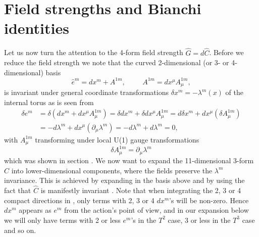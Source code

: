 \section{Field strengths and  Bianchi identities}
Let us now turn the attention to the 4-form field strength $\hat{G}=d\hat{C}$. Before we reduce the field strength 
we note that the curved 2-dimensional (or 3- or 4-dimensional) basis
\begin{equation}
\hat{e}^m = dx^m + A^{1m}, \hspace{1cm} A^{1m}=dx^{\mu}A_{\mu}^{1m},
\end{equation}
is invariant under general coordinate transformations $\delta x^m = -\lambda^m(x)$ of the internal torus as is seen from
\begin{align}
\delta e^m &= \delta(dx^m + dx^{\mu}A_{\mu}^{1m}) = \delta dx^m + \delta dx^{\mu}A_{\mu}^{1m} = d\delta x^m + dx^{\mu}(\delta A_{\mu}^{1m}) \nonumber \\
&= -d\lambda^m + dx^{\mu}({\partial}_{\mu}\lambda^m)=-d\lambda^m + d\lambda^m =0,
\end{align}
with $A_{\mu}^{1m}$ transforming under local U(1) gauge transformations
\begin{equation}
\delta A_{\mu}^{1m} = {\partial}_{\mu}\lambda^m
\end{equation}
which was shown in section .
We now want to expand the 11-dimensional 3-form $\hat{C}$ into lower-dimensional components, where the fields 
preserve the $\lambda^m$ invariance. This is achieved by expanding in the basis above and by using the fact that 
$\hat{C}$ is manifestly invariant . Note that when
integrating the 2, 3 or 4 compact directions in , only terms with
2, 3 or 4 $dx^m$'s will be non-zero. Hence $dx^m$ appears as $e^m$ from
the action's point of view, and in our expansion below we will
only have terms with 2 or less $e^m$'s in the $T^2$ case, 3 or less in
the $T^3$ case and so on.

